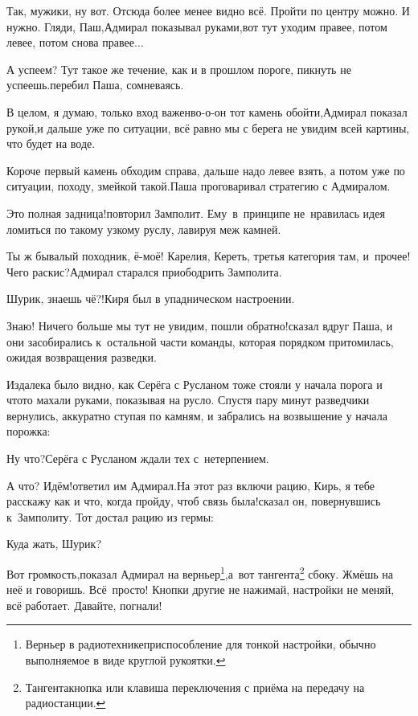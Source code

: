 \diagdash Так, мужики, ну вот. Отсюда более менее видно всё. Пройти по центру можно. И нужно. Гляди, Паш,\mdash Адмирал показывал руками,\mdash вот тут уходим правее, потом левее, потом снова правее$\ldots$

\diagdash А успеем? Тут такое же течение, как и в прошлом пороге, пикнуть не успеешь.\mdash перебил Паша, сомневаясь.

\diagdash В целом, я думаю, только вход важен\mdash во-о-он тот камень обойти,\mdash Адмирал показал рукой,\mdash и дальше уже по ситуации, всё равно мы с берега не увидим всей картины, что будет на воде.

\diagdash Короче первый камень обходим справа, дальше надо левее взять, а потом уже по ситуации, походу, змейкой такой.\mdash Паша проговаривал стратегию с Адмиралом. 

\diagdash Это полная задница!\mdash повторил Замполит. Ему~в~принципе не~нравилась идея ломиться по такому узкому руслу, лавируя меж камней.

\diagdash Ты ж бывалый походник, ё-моё! Карелия, Кереть, третья категория там, и~прочее! Чего раскис?\mdash Адмирал старался приободрить Замполита.

\diagdash Шурик, знаешь чё?!\mdash Киря был в упадническом настроении.

\diagdash Знаю! Ничего больше мы тут не увидим, пошли обратно!\mdash сказал вдруг Паша, и они засобирались к~остальной части команды, которая порядком притомилась, ожидая возвращения разведки. 

Издалека было видно, как Серёга с Русланом тоже стояли у начала порога и что\sdash то махали руками, показывая на русло. Спустя пару минут разведчики вернулись, аккуратно ступая по камням, и забрались на возвышение у начала порожка:

\diagdash Ну что?\mdash Серёга с Русланом ждали тех с~нетерпением.

\diagdash А что? Идём!\mdash ответил им Адмирал.\mdash На этот раз включи рацию, Кирь, я тебе расскажу как и что, когда пройду, чтоб связь была!\mdash сказал он, повернувшись к~Замполиту. Тот достал рацию из гермы:

\diagdash Куда жать, Шурик?

\renewcommand*{\thefootnote}{\arabic{footnote}}
\setcounter{footnote}{0}
\diagdash Вот громкость,\mdash показал Адмирал на верньер\footnote{Верньер в радиотехнике\mdash приспособление для тонкой настройки, обычно выполняемое в виде круглой рукоятки.},\mdash а~вот тангента\footnote{Тангента\mdash кнопка или клавиша переключения с приёма на передачу на радиостанции.} сбоку. Жмёшь на неё и говоришь. Всё~просто! Кнопки другие не нажимай, настройки не меняй, всё работает. Давайте, погнали!

